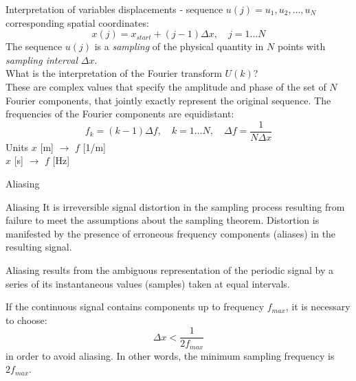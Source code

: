 \documentclass[10pt,aspectratio=169]{beamer} %
\begin{document}
\begin{frame}[fragile]{Interpretation of variables}
displacements - sequence \( u(j) = u_1, u_2, \ldots, u_{N}\)\\
corresponding spatial coordinates:
\begin{equation*}
x(j) = x_{start} +(j-1)  \Delta x, \quad j=1 \ldots N
\end{equation*}
The sequence  \( u(j) \) is a \emph{sampling} of the physical quantity in \(N\) points with \emph{sampling interval} \(\Delta x\).\\
What is the interpretation of the Fourier transform \(U(k)\)?\\
These are complex values that specify the amplitude and phase of the set of \(N\) Fourier components, that jointly exactly represent the original sequence.
The frequencies of the Fourier components are \alert{equidistant}:
\begin{equation*}
f_k = (k-1) \Delta f, \quad k = 1 \ldots N, \quad \Delta f = \frac{1}{N \Delta x}
\end{equation*}
Units \(x\) [m] \(\rightarrow\) \(f\) [1/m]\\
 \hspace{10mm}\(x\) [s] \(\rightarrow\) \(f\) [Hz]
\end{frame}
\begin{frame}{Aliasing}
\begin{alertblock}{Aliasing}
	It is irreversible signal distortion in the sampling process resulting from failure to meet the assumptions about the sampling theorem. 
	Distortion is manifested by the presence of erroneous frequency components (aliases) in the resulting signal.
\end{alertblock}
Aliasing results from the ambiguous representation of the periodic signal by a series of its instantaneous values (samples) taken at equal intervals.

If the continuous signal contains components up to frequency \(f_{max}\), it is necessary to choose:
\begin{equation*}
\Delta x < \frac{1}{2 f_{max}}
\end{equation*}
in order to avoid aliasing. In other words, the minimum sampling frequency is \(2 f_{max}\).
\end{frame}
\end{document}
